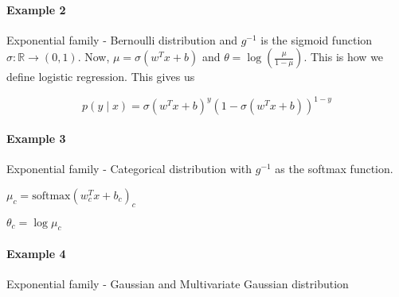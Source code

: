 \documentclass{article}
\begin{document}
\paragraph{Example 2} Exponential family - Bernoulli distribution and $g^{-1}$ is the sigmoid function $\sigma: \mathbb{R} \rightarrow (0, 1)$.
Now, $\mu = \sigma(w^Tx + b)$ and $\theta = \log \left(\frac{\mu }{1 - \mu}\right)$. This is how we define logistic regression. This gives us

$$p(y \mid x) = \sigma(w^Tx + b)^y(1 - \sigma(w^Tx + b))^{1-y}$$

\paragraph{Example 3} Exponential family - Categorical distribution with $g^{-1}$ as the softmax function.

$\mu_c = \text{softmax}(w_c^T x + b_c)_c$

$\theta_c = \log \mu_c$


\paragraph{Example 4} Exponential family - Gaussian and Multivariate Gaussian distribution
\end{document}
